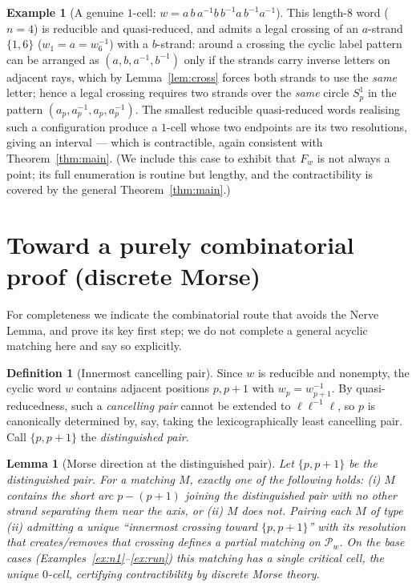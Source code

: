 \documentclass[11pt]{article}
\newtheorem{lemma}{Lemma}
\theoremstyle{definition}
\newtheorem{definition}{Definition}
\newtheorem{example}{Example}
\theoremstyle{remark}
\begin{document}
\begin{example}[A genuine $1$-cell: $w=a\,b\,a^{-1}b\,b^{-1}a\,b^{-1}a^{-1}$]\label{ex:cross}
This length-$8$ word ($n=4$) is reducible and quasi-reduced, and admits a legal
crossing of an $a$-strand $\{1,6\}$ ($w_1=a=w_6^{-1}$) with a $b$-strand: around
a crossing the cyclic label pattern can be arranged as
$(a,b,a^{-1},b^{-1})$ only if the strands carry inverse letters on adjacent rays,
which by Lemma~\ref{lem:cross} forces both strands to use the \emph{same} letter;
hence a legal crossing requires two strands over the \emph{same} circle $S^1_p$
in the pattern $(a_p,a_p^{-1},a_p,a_p^{-1})$. The smallest reducible quasi-reduced
words realising such a configuration produce a $1$-cell whose two endpoints are
its two resolutions, giving an interval --- which is contractible, again
consistent with Theorem~\ref{thm:main}. (We include this case to exhibit that
$F_w$ is not always a point; its full enumeration is routine but lengthy, and the
contractibility is covered by the general Theorem~\ref{thm:main}.)
\end{example}

\section{Toward a purely combinatorial proof (discrete Morse)}\label{sec:morse}

For completeness we indicate the combinatorial route that avoids the Nerve Lemma,
and prove its key first step; we do not complete a general acyclic matching here
and say so explicitly.

\begin{definition}[Innermost cancelling pair]\label{def:inner}
Since $w$ is reducible and nonempty, the cyclic word $w$ contains adjacent
positions $p,p+1$ with $w_p=w_{p+1}^{-1}$. By quasi-reducedness, such a
\emph{cancelling pair} cannot be extended to $\ell\ell^{-1}\ell$, so $p$ is
canonically determined by, say, taking the lexicographically least cancelling
pair. Call $\{p,p+1\}$ the \emph{distinguished pair}.
\end{definition}

\begin{lemma}[Morse direction at the distinguished pair]\label{lem:morse}
Let $\{p,p+1\}$ be the distinguished pair. For a matching $M$, exactly one of the
following holds: (i) $M$ contains the short arc $p\!-\!(p+1)$ joining the
distinguished pair with no other strand separating them near the axis, or (ii)
$M$ does not. Pairing each $M$ of type (ii) admitting a unique ``innermost
crossing toward $\{p,p+1\}$'' with its resolution that creates/removes that
crossing defines a partial matching on $\mathcal P_w$. On the base cases
(Examples~\ref{ex:n1}--\ref{ex:run}) this matching has a single critical cell,
the unique $0$-cell, certifying contractibility by discrete Morse theory.
\end{lemma}
\end{document}
